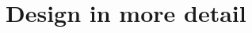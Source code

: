 \documentclass{UoYCSproject}
\begin{document}




\section{Design in more detail} %

\end{document}
